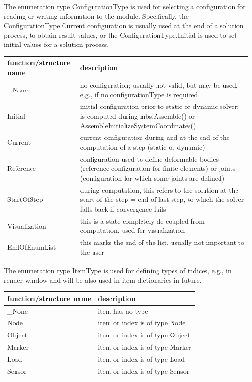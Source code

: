 \label{sec:ConfigurationType}
The enumeration type  ConfigurationType is used for selecting a configuration for reading or writing information to the module. Specifically, the ConfigurationType.Current configuration is usually used at the end of a solution process, to obtain result values, or the ConfigurationType.Initial is used to set initial values for a solution process.



\begin{center}
\footnotesize
\begin{longtable}{| p{8cm} | p{8cm} |} 
\hline
{\bf function/structure name} & {\bf description}\\ \hline
  \_None & no configuration; usually not valid, but may be used, e.g., if no configurationType is required\\ \hline  
  Initial & initial configuration prior to static or dynamic solver; is computed during mbs.Assemble() or AssembleInitializeSystemCoordinates()\\ \hline  
  Current & current configuration during and at the end of the computation of a step (static or dynamic)\\ \hline  
  Reference & configuration used to define deformable bodies (reference configuration for finite elements) or joints (configuration for which some joints are defined)\\ \hline  
  StartOfStep & during computation, this refers to the solution at the start of the step = end of last step, to which the solver falls back if convergence fails\\ \hline  
  Visualization & this is a state completely de-coupled from computation, used for visualization\\ \hline  
  EndOfEnumList & this marks the end of the list, usually not important to the user\\ \hline  
\end{longtable}
\end{center}

\label{sec:ItemType}
The enumeration type  ItemType is used for defining types of indices, e.g., in render window and will be also used in item dictionaries in future.



\begin{center}
\footnotesize
\begin{longtable}{| p{8cm} | p{8cm} |} 
\hline
{\bf function/structure name} & {\bf description}\\ \hline
  \_None & item has no type\\ \hline  
  Node & item or index is of type Node\\ \hline  
  Object & item or index is of type Object\\ \hline  
  Marker & item or index is of type Marker\\ \hline  
  Load & item or index is of type Load\\ \hline  
  Sensor & item or index is of type Sensor\\ \hline  
\end{longtable}
\end{center}

